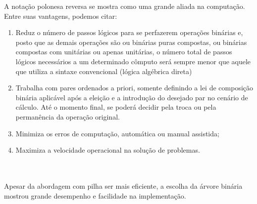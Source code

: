 \documentclass{article}
\begin{document}
\begin{list_type}
\item
A notação polonesa reversa se mostra como uma grande aliada na computação. Entre suas vantagens, podemos citar:
\\

\begin{enumerate}
    \item Reduz o número de passos lógicos para se perfazerem operações binárias e, posto que as demais operações são ou binárias puras compostas, ou binárias compostas com unitárias ou apenas unitárias, o número total de passos lógicos necessários a um determinado cômputo será sempre menor que aquele que utiliza a sintaxe convencional (lógica algébrica direta)

    \item Trabalha com pares ordenados a priori, somente definindo a lei de composição binária aplicável após a eleição e a introdução do desejado par no cenário de cálculo. Até o momento final, se poderá decidir pela troca ou pela permanência da operação original.

    \item  Minimiza os erros de computação, automática ou manual assistida;

    \item  Maximiza a velocidade operacional na solução de problemas.

\end{enumerate}
\\
\\
Apesar da abordagem com pilha ser mais eficiente, a escolha da árvore binária mostrou grande desempenho e facilidade na implementação.
\end{list_type}
\end{document}
